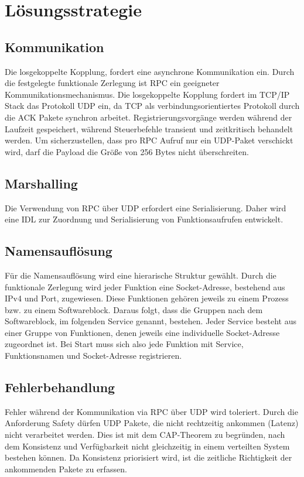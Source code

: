 \chapter{Lösungsstrategie}


\section*{Kommunikation}
Die losgekoppelte Kopplung, fordert eine asynchrone Kommunikation ein. 
Durch die festgelegte funktionale Zerlegung ist RPC ein geeigneter Kommunikationsmechanismus. Die losgekoppelte Kopplung fordert im TCP/IP Stack das Protokoll UDP ein, da TCP als verbindungsorientiertes Protokoll durch die ACK Pakete synchron arbeitet. Registrierungsvorgänge werden während der Laufzeit gespeichert, während Steuerbefehle transient und zeitkritisch behandelt werden. Um sicherzustellen, dass pro RPC Aufruf nur ein UDP-Paket verschickt wird, darf die Payload die Größe von 256 Bytes nicht überschreiten.
	
\section*{Marshalling}
Die Verwendung von RPC über UDP erfordert eine Serialisierung.
Daher wird eine IDL zur Zuordnung und Serialisierung von Funktionsaufrufen entwickelt.
	
\section*{Namensauflösung}
Für die Namensauflösung wird eine hierarische Struktur gewählt. Durch die funktionale Zerlegung wird jeder Funktion eine Socket-Adresse, bestehend aus IPv4 und Port, zugewiesen. Diese Funktionen gehören jeweils zu einem Prozess bzw. zu einem Softwareblock. Daraus folgt, dass die Gruppen nach dem Softwareblock, im folgenden Service genannt, bestehen. Jeder Service besteht aus einer Gruppe von Funktionen, denen jeweils eine individuelle Socket-Adresse zugeordnet ist. Bei Start muss sich also jede Funktion mit Service, Funktionsnamen und Socket-Adresse registrieren.

\section*{Fehlerbehandlung}
Fehler während der Kommunikation via RPC über UDP wird toleriert. Durch die Anforderung Safety dürfen UDP Pakete, die nicht rechtzeitig ankommen (Latenz) nicht verarbeitet werden. Dies ist mit dem CAP-Theorem zu begründen, nach dem Konsistenz und Verfügbarkeit nicht gleichzeitig in einem verteilten System bestehen können. Da Konsistenz priorisiert wird, ist die zeitliche Richtigkeit der ankommenden Pakete zu erfassen. 

